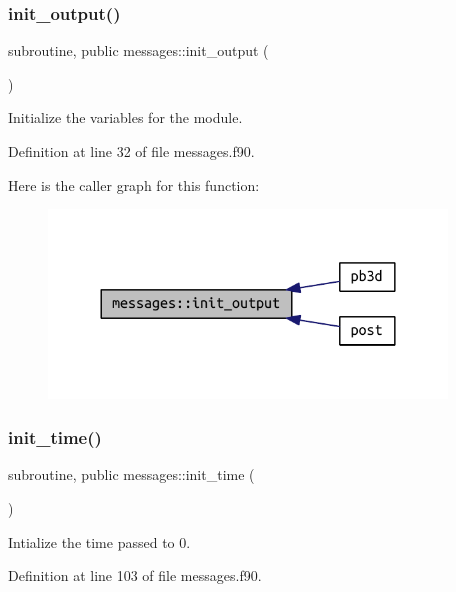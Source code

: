 \subsubsection{\texorpdfstring{init\+\_\+output()}{init\_output()}}
{\footnotesize\ttfamily subroutine, public messages\+::init\+\_\+output (\begin{DoxyParamCaption}{ }\end{DoxyParamCaption})}



Initialize the variables for the module. 



Definition at line 32 of file messages.\+f90.

Here is the caller graph for this function\+:
\nopagebreak
\begin{figure}[H]
\begin{center}
\leavevmode
\includegraphics[width=300pt]{namespacemessages_a5e45296f088e9f31115a3b8d869f3177_icgraph}
\end{center}
\end{figure}
\mbox{\label{namespacemessages_a8ed785522aec7ac549263cdd54a8619a}} 
\subsubsection{\texorpdfstring{init\+\_\+time()}{init\_time()}}
{\footnotesize\ttfamily subroutine, public messages\+::init\+\_\+time (\begin{DoxyParamCaption}{ }\end{DoxyParamCaption})}



Intialize the time passed to 0. 



Definition at line 103 of file messages.\+f90.


